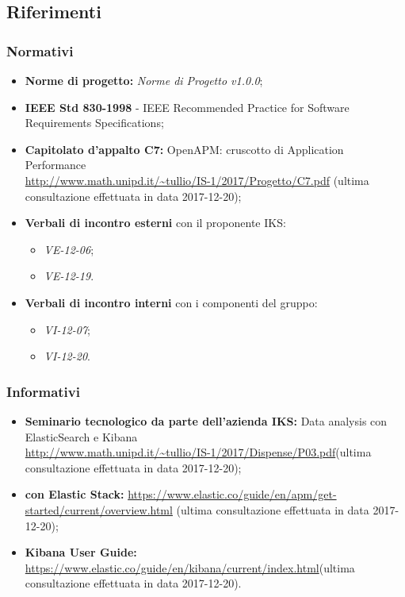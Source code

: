 	\subsection{Riferimenti}
	\subsubsection{Normativi}
	\begin{itemize}
		\item \textbf{Norme di progetto:} \emph{Norme di Progetto v1.0.0};
		\item \textbf{IEEE Std 830-1998} - IEEE Recommended Practice for Software Requirements Specifications;
		\item \textbf{Capitolato d'appalto C7:} OpenAPM: cruscotto di Application Performance  \\ \url{http://www.math.unipd.it/~tullio/IS-1/2017/Progetto/C7.pdf} (ultima consultazione effettuata in data 2017-12-20);
		\item \textbf{Verbali di incontro esterni} con il proponente IKS: \begin{itemize}
			\item \emph{VE-12-06};
			\item \emph{VE-12-19}.
		\end{itemize}
		\item \textbf{Verbali di incontro interni} con i componenti del gruppo:
		\begin{itemize}
			\item \emph{VI-12-07};
			\item \emph{VI-12-20}.
		\end{itemize}
	\end{itemize}
	
	\subsubsection{Informativi}
	\begin{itemize}
		\item \textbf{Seminario tecnologico da parte dell'azienda IKS:} Data analysis con ElasticSearch e Kibana \\ \url{http://www.math.unipd.it/~tullio/IS-1/2017/Dispense/P03.pdf}(ultima consultazione effettuata in data 2017-12-20);
		\item \textbf{ con Elastic Stack:} \url{https://www.elastic.co/guide/en/apm/get-started/current/overview.html} (ultima consultazione effettuata in data 2017-12-20);
		\item \textbf{Kibana User Guide:} \url{https://www.elastic.co/guide/en/kibana/current/index.html}(ultima consultazione effettuata in data 2017-12-20).
	
	\end{itemize}
	